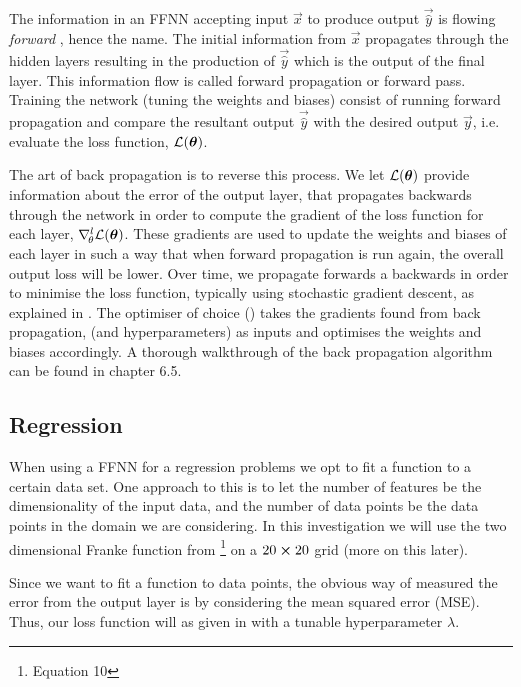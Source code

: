     The information in an FFNN accepting input $\vec{x}$ to produce output $\vec{\hat{y}}$ is flowing \textit{forward} \citep{Goodfellow2016}, hence the name. The initial information from $\vec{x}$ propagates through the hidden layers resulting in the production of $\vec{\hat{y}}$ which is the output of the final layer. This information flow is called forward propagation or forward pass. Training the network (tuning the weights and biases) consist of running forward propagation and compare the resultant output $\vec{\hat{y}}$ with the desired output $\vec{y}$, i.e. evaluate the loss function, $\mathcal{L}(\boldsymbol{\theta})$. 
    

    The art of back propagation is to reverse this process. We let $\mathcal{L}(\boldsymbol{\theta})$ provide information about the error of the output layer, that propagates backwards through the network in order to compute the gradient of the loss function for each layer, $\nabla^l_{\!\theta}\mathcal{L}(\boldsymbol{\theta})$. These gradients are used to update the weights and biases of each layer in such a way that when forward propagation is run again, the overall output loss will be lower. Over time, we propagate forwards a backwards in order to minimise the loss function, typically using stochastic gradient descent, as explained in . The optimiser of choice () takes the gradients found from back propagation, (and hyperparameters) as inputs and optimises the weights and biases accordingly. A thorough walkthrough of the back propagation algorithm can be found in \citep{Goodfellow2016} chapter 6.5.

\subsection{Regression}\label{sec:regression}
    When using a FFNN for a regression problems we opt to fit a function to a certain data set. One approach to this is to let the number of features be the dimensionality of the input data, and the number of data points be the data points in the domain we are considering. In this investigation we will use the two dimensional Franke function from \projectOne\footnote{Equation 10} on a $20\cross 20$ grid (more on this later).
    
    Since we want to fit a function to data points, the obvious way of measured the error from the output layer is by considering the mean squared error (MSE). Thus, our loss function will as given in  with a tunable hyperparameter $\lambda$. 

